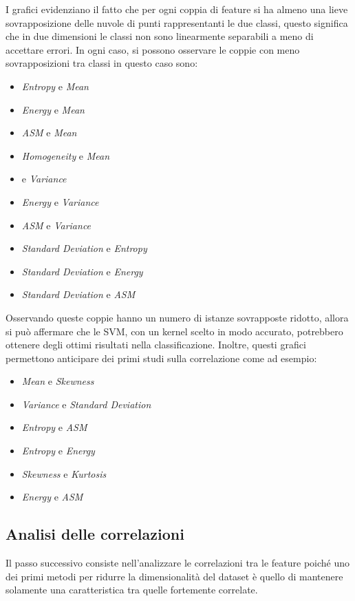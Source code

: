 I grafici evidenziano il fatto che per ogni coppia di feature si ha almeno una
lieve sovrapposizione delle nuvole di punti rappresentanti le due classi, questo
significa che in due dimensioni le classi non sono linearmente separabili a meno
di accettare errori. In ogni caso, si possono osservare le coppie con
meno sovrapposizioni tra classi in questo caso sono:
\begin{itemize}
      \item \textit{Entropy} e \textit{Mean}
      \item \textit{Energy} e \textit{Mean}
      \item \textit{ASM} e \textit{Mean}
      \item \textit{Homogeneity} e \textit{Mean}
      \item {} e \textit{Variance}
      \item \textit{Energy} e \textit{Variance}
      \item \textit{ASM} e \textit{Variance}
      \item \textit{Standard Deviation} e \textit{Entropy}
      \item \textit{Standard Deviation} e \textit{Energy}
      \item \textit{Standard Deviation} e \textit{ASM}
\end{itemize}
Osservando queste coppie hanno un numero di istanze sovrapposte ridotto, allora
si può affermare che le SVM, con un kernel scelto in modo accurato, potrebbero
ottenere degli ottimi risultati nella classificazione. Inoltre, questi grafici
permettono anticipare dei primi studi sulla correlazione come ad esempio:
\begin{itemize}
      \item \textit{Mean} e \textit{Skewness}
      \item \textit{Variance} e \textit{Standard Deviation}
      \item \textit{Entropy} e \textit{ASM}
      \item \textit{Entropy} e \textit{Energy}
      \item \textit{Skewness} e \textit{Kurtosis}
      \item \textit{Energy} e \textit{ASM}
\end{itemize}
\subsection{Analisi delle correlazioni} \label{sec:correlazione}
Il passo successivo consiste nell'analizzare le correlazioni tra le feature 
poiché uno dei primi metodi per ridurre la dimensionalità del dataset è quello 
di mantenere solamente una caratteristica tra quelle fortemente correlate.

